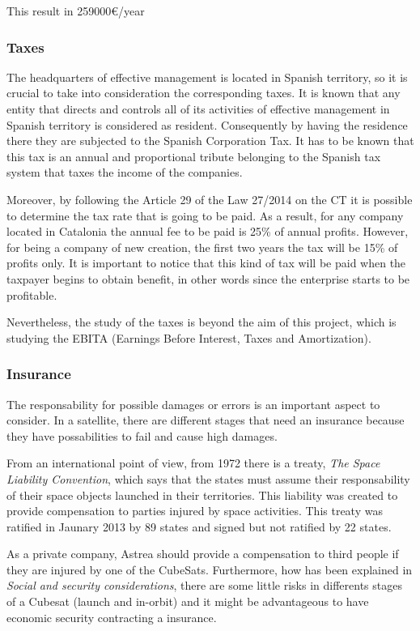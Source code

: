 This result in 259000\euro/year
\subsubsection{Taxes}
The headquarters of effective management is located in Spanish territory, so it is crucial to take into consideration the corresponding taxes. It is known that any entity that directs and controls all of its activities of effective management in Spanish territory is considered as resident. Consequently by having the residence there they are subjected to the Spanish Corporation Tax. It has to be known that this tax is an annual and proportional tribute belonging to the Spanish tax system that taxes the income of the companies.

Moreover, by following the Article 29 of the Law 27/2014 on the CT it is possible to determine the tax rate that is going to be paid. As a result, for any company located in Catalonia the annual fee to be paid is 25\% of annual profits. However, for being a company of new creation, the first two years the tax will be 15\% of profits only. It is important to notice that this kind of tax will be paid when the taxpayer begins to obtain benefit, in other words since the enterprise starts to be profitable. 

Nevertheless, the study of the taxes is beyond the aim of this project, which is studying the EBITA (Earnings Before Interest, Taxes and Amortization).  
\subsubsection{Insurance}

The responsability for possible damages or errors is an important aspect to consider. In a satellite, there are different stages that need an insurance because they have possabilities to fail and cause high damages.

From an international point of view, from 1972 there is a treaty, \textit{The Space Liability Convention}, which says that the states must assume their responsability of their space objects launched in their territories. This liability was created to provide compensation to parties injured by space activities. This treaty was ratified in Jaunary 2013 by 89 states and signed but not ratified by 22 states. \cite{UN}

As a private company, Astrea should provide a compensation to third people if they are injured by one of the CubeSats. Furthermore,  how has been explained in \textit{Social and security considerations}, there are some little risks in differents stages of a Cubesat (launch and in-orbit) and it might be advantageous to have economic security contracting a insurance. 

